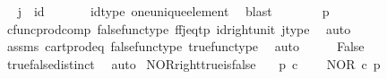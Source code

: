 \begin{isabellebody}
\ \isamarkupfalse%
\ {\isachardoublequoteopen}j\ {\isacharequal}{\kern0pt}\ id\ {\isasymone}{\isachardoublequoteclose}\isanewline
\ \ \ \ \isamarkupfalse%
\ id{\isacharunderscore}{\kern0pt}type\ one{\isacharunderscore}{\kern0pt}unique{\isacharunderscore}{\kern0pt}element\ \isamarkupfalse%
\ blast\isanewline
\ \ \isamarkupfalse%
\ \isamarkupfalse%
\ {\isachardoublequoteopen}{\isasymlangle}{\isasymf}{\isacharcomma}{\kern0pt}{\isasymf}{\isasymrangle}\ {\isacharequal}{\kern0pt}\ {\isasymlangle}{\isasymt}{\isacharcomma}{\kern0pt}p{\isasymrangle}{\isachardoublequoteclose}\isanewline
\ \ \ \ \isamarkupfalse%
\ cfunc{\isacharunderscore}{\kern0pt}prod{\isacharunderscore}{\kern0pt}comp\ false{\isacharunderscore}{\kern0pt}func{\isacharunderscore}{\kern0pt}type\ ff{\isacharunderscore}{\kern0pt}j{\isacharunderscore}{\kern0pt}eq{\isacharunderscore}{\kern0pt}tp\ id{\isacharunderscore}{\kern0pt}right{\isacharunderscore}{\kern0pt}unit{}\ j{\isacharunderscore}{\kern0pt}type\ \isamarkupfalse%
\ auto\isanewline
\ \ \isamarkupfalse%
\ \isamarkupfalse%
\ {\isachardoublequoteopen}{\isasymf}\ {\isacharequal}{\kern0pt}\ {\isasymt}{\isachardoublequoteclose}\isanewline
\ \ \ \ \isamarkupfalse%
\ assms\ cart{\isacharunderscore}{\kern0pt}prod{\isacharunderscore}{\kern0pt}eq{}\ false{\isacharunderscore}{\kern0pt}func{\isacharunderscore}{\kern0pt}type\ true{\isacharunderscore}{\kern0pt}func{\isacharunderscore}{\kern0pt}type\ \isamarkupfalse%
\ auto\isanewline
\ \ \isamarkupfalse%
\ \isamarkupfalse%
\ False\isanewline
\ \ \ \ \isamarkupfalse%
\ true{\isacharunderscore}{\kern0pt}false{\isacharunderscore}{\kern0pt}distinct\ \isamarkupfalse%
\ auto\isanewline
{}\isamarkupfalse%
%
\endisatagproof
{\isafoldproof}%
%
\isadelimproof
\isanewline
%
\endisadelimproof
\isanewline
{}\isamarkupfalse%
\ NOR{\isacharunderscore}{\kern0pt}right{\isacharunderscore}{\kern0pt}true{\isacharunderscore}{\kern0pt}is{\isacharunderscore}{\kern0pt}false{\isacharcolon}{\kern0pt}\isanewline
\ \ \ {\isachardoublequoteopen}p\ {\isasymin}\isactrlsub c\ {\isasymOmega}{\isachardoublequoteclose}\isanewline
\ \ \ {\isachardoublequoteopen}NOR\ {\isasymcirc}\isactrlsub c\ {\isasymlangle}p{\isacharcomma}{\kern0pt}{\isasymt}{\isasymrangle}\ {\isacharequal}{\kern0pt}\ {\isasymf}{\isachardoublequoteclose}\isanewline

\end{isabellebody}
